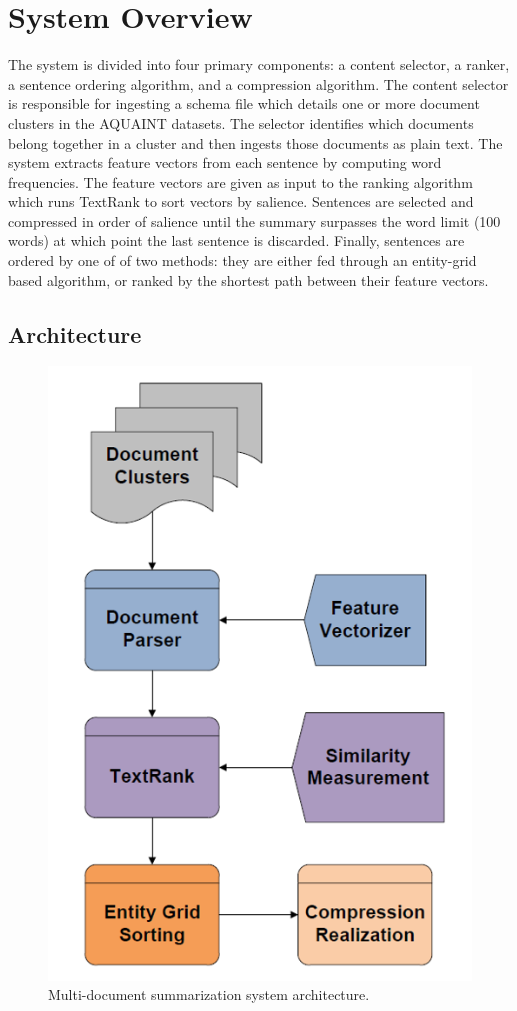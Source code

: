 \documentclass[11pt]{article}
\begin{document}
\section{System Overview}
The system is divided into four primary components: a content selector, a ranker, a sentence ordering algorithm, and a compression algorithm. The content selector is responsible for ingesting a schema file which details one or more document clusters in the AQUAINT datasets. The selector identifies which documents belong together in a cluster and then ingests those documents as plain text. The system extracts feature vectors from each sentence by computing word frequencies. The feature vectors are given as input to the ranking algorithm which runs TextRank to sort vectors by salience. Sentences are selected and compressed in order of salience until the summary surpasses the word limit (100 words) at which point the last sentence is discarded. Finally, sentences are ordered by one of of two methods: they are either fed through an entity-grid based algorithm, or ranked by the shortest path between their feature vectors.

\subsection{Architecture}
\begin{figure}
  \includegraphics[width=.9\linewidth,height=.25\textheight,keepaspectratio]{arch_final.png}
  \caption{Multi-document summarization system architecture.}
  \label{fig:arch}
\end{figure}
\end{document}

